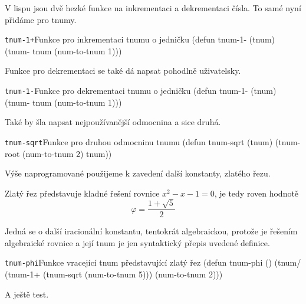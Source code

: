 V lispu jsou dvě hezké funkce na inkrementaci a dekrementaci čísla. To samé nyní přidáme pro tnumy.

\begin{lispcode}{\texttt{tnum-1+}}{Funkce pro inkrementaci tnumu o jedničku}
(\textcolor{funkcionalni}{defun} \textcolor{pojmenovan}{tnum-1-} (tnum)
  (\textcolor{moje}{tnum-} tnum (\textcolor{moje}{num-to-tnum} 1)))
\end{lispcode}

Funkce pro dekrementaci se také dá napsat pohodlně uživatelsky.

\begin{lispcode}{\texttt{tnum-1-}}{Funkce pro dekrementaci tnumu o jedničku}
(\textcolor{funkcionalni}{defun} \textcolor{pojmenovan}{tnum-1-} (tnum)
  (\textcolor{moje}{tnum-} tnum (\textcolor{moje}{num-to-tnum} 1)))
\end{lispcode}

Také by šla napsat nejpoužívanější odmocnina a sice druhá.

\begin{lispcode}{\texttt{tnum-sqrt}}{Funkce pro druhou odmocninu tnumu}
(\textcolor{funkcionalni}{defun} \textcolor{pojmenovan}{tnum-sqrt} (tnum)
  (\textcolor{moje}{tnum-root} (\textcolor{moje}{num-to-tnum} 2) tnum))
\end{lispcode}

Výše naprogramované použijeme k zavedení další konstanty, zlatého řezu.

\begin{definition}
Zlatý řez představuje kladné řešení rovnice $x^2-x-1=0$, je tedy roven hodnotě
\begin{equation}
\varphi=\frac{1+\sqrt{5}}{2}
\end{equation}
\end{definition}

Jedná se o další iracionální konstantu, tentokrát algebraickou, protože je řešením algebraické rovnice a její tnum je jen syntaktický přepis uvedené definice.

\begin{lispcode}{\texttt{tnum-phi}}{Funkce vracející tnum představující zlatý řez}
(\textcolor{funkcionalni}{defun} \textcolor{pojmenovan}{tnum-phi} ()
  (\textcolor{moje}{tnum/} (\textcolor{moje}{tnum-1+} (\textcolor{moje}{tnum-sqrt} (\textcolor{moje}{num-to-tnum} 5))) (\textcolor{moje}{num-to-tnum} 2)))
\end{lispcode}

A ještě test.

